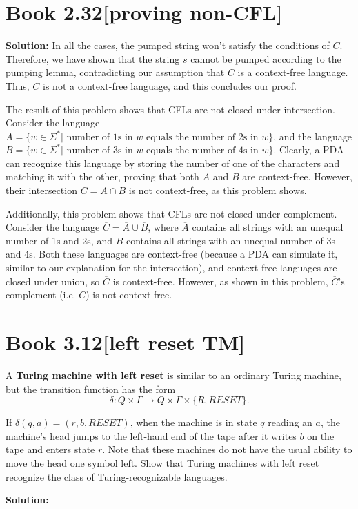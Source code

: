 \documentclass[11pt]{article}
\newcommand\union{\cup}
\newcommand\intersect{\cap}
\newenvironment{question}[2]
{\newpage\section{#1\texorpdfstring{\hfill}{horizontal spacing}{\rm\normalsize #2}}}{}
\newenvironment{solution}
{\textbf{Solution: }\color{blue}}
{\color{black}}
\begin{document}
\begin{question}{Book 2.32}{[proving non-CFL]}
\begin{solution}
In all the cases, the pumped string won't satisfy the conditions of \(C\). Therefore, we have shown that the string \(s\) cannot be pumped according to the pumping lemma, contradicting our assumption that \(C\) is a context-free language. Thus, \(C\) is not a context-free language, and this concludes our proof.

The result of this problem shows that CFLs are not closed under intersection. Consider the language \(A = \{ w \in \Sigma^* | \text{ number of 1s in } w \text{ equals the number of 2s in } w \}\), and the language \(B = \{ w \in \Sigma^* | \text{ number of 3s in } w \text{ equals the number of 4s in } w\}\). Clearly, a PDA can recognize this language by storing the number of one of the characters and matching it with the other, proving that both \(A\) and \(B\) are context-free. However, their intersection \(C=A \intersect B\) is not context-free, as this problem shows.

Additionally, this problem shows that CFLs are not closed under complement. Consider the language \(\overline{C} = \overline{A} \union \overline{B}\), where \(\overline{A}\) contains all strings with an unequal number of 1s and 2s, and \(\overline{B}\) contains all strings with an unequal number of 3s and 4s. Both these languages are context-free (because a PDA can simulate it, similar to our explanation for the intersection), and context-free languages are closed under union, so \(\overline{C}\) is context-free. However, as shown in this problem, \(\overline{C}\)'s complement (i.e. \(C\)) is not context-free.

\end{solution}
\end{question}


\begin{question}{Book 3.12}{[left reset TM]}

A \textbf{Turing machine with left reset} is similar to an ordinary Turing machine, but the transition function has the form
\[\delta : Q \times \Gamma \rightarrow Q \times \Gamma \times \{R, RESET\}.\]

If \(\delta (q,a) = (r,b,RESET)\), when the machine is in state \(q\) reading an \(a\), the machine's head jumps to the left-hand end of the tape after it writes \(b\) on the tape and enters state \(r\). Note that these machines do not have the usual ability to move the head one symbol left. Show that Turing machines with left reset recognize the class of Turing-recognizable languages.

\begin{solution}



\end{solution}
\end{question}
\end{document}
